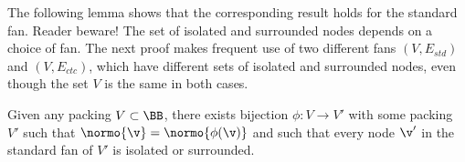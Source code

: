 The following lemma shows that the corresponding result holds for the
standard fan.  Reader beware!  The set of isolated and surrounded
nodes depends on a choice of fan.  The next proof makes frequent use
of two different fans $(V,E_{std})$ and $(V,E_{ctc})$, which have
different sets of isolated and surrounded nodes, even though the
set $V$ is the same in both cases.



\begin{lemma}[]
\label{lemma:surrounded}  %
Given any packing $V\subset \BB$, there exists bijection $\phi:V\to
V'$ with some packing $V'$ such that $\normo{\v} = \normo{\phi(\v)}$
and such that every node $\v'$ in the standard fan of $V'$ is isolated
or surrounded.  %
\end{lemma}

